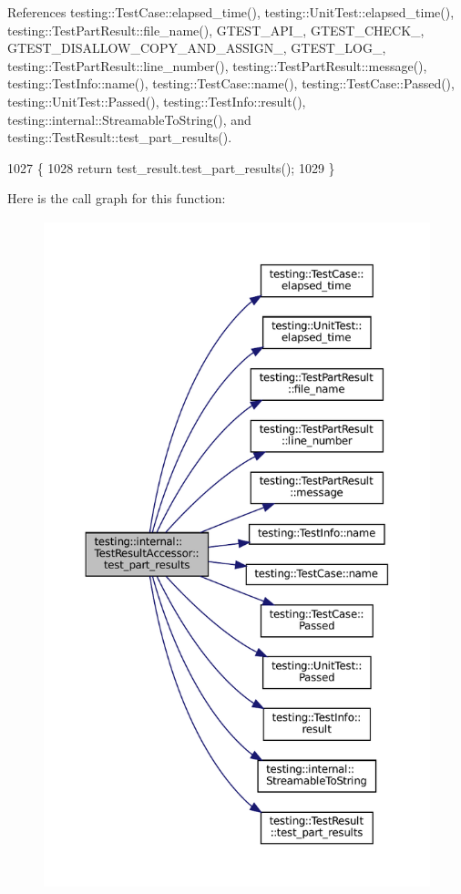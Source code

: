 References testing\+::\+Test\+Case\+::elapsed\+\_\+time(), testing\+::\+Unit\+Test\+::elapsed\+\_\+time(), testing\+::\+Test\+Part\+Result\+::file\+\_\+name(), G\+T\+E\+S\+T\+\_\+\+A\+P\+I\+\_\+, G\+T\+E\+S\+T\+\_\+\+C\+H\+E\+C\+K\+\_\+, G\+T\+E\+S\+T\+\_\+\+D\+I\+S\+A\+L\+L\+O\+W\+\_\+\+C\+O\+P\+Y\+\_\+\+A\+N\+D\+\_\+\+A\+S\+S\+I\+G\+N\+\_\+, G\+T\+E\+S\+T\+\_\+\+L\+O\+G\+\_\+, testing\+::\+Test\+Part\+Result\+::line\+\_\+number(), testing\+::\+Test\+Part\+Result\+::message(), testing\+::\+Test\+Info\+::name(), testing\+::\+Test\+Case\+::name(), testing\+::\+Test\+Case\+::\+Passed(), testing\+::\+Unit\+Test\+::\+Passed(), testing\+::\+Test\+Info\+::result(), testing\+::internal\+::\+Streamable\+To\+String(), and testing\+::\+Test\+Result\+::test\+\_\+part\+\_\+results().


\begin{DoxyCode}
1027                                      \{
1028     \textcolor{keywordflow}{return} test\_result.test\_part\_results();
1029   \}
\end{DoxyCode}
Here is the call graph for this function\+:
\nopagebreak
\begin{figure}[H]
\begin{center}
\leavevmode
\includegraphics[height=550pt]{classtesting_1_1internal_1_1TestResultAccessor_a55d771904317c1b0cc380104d175f1db_cgraph}
\end{center}
\end{figure}


